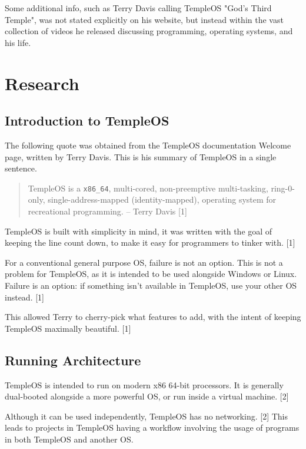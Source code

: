 \documentclass[11pt]{article}
\begin{document}
Some additional info, such as Terry Davis calling TempleOS "God's Third Temple",
was not stated explicitly on his website, but instead within the vast collection
of videos he released discussing programming, operating systems, and his life.

 \newpage
{}

\section{Research}
\label{sec:orgc9641cb}

\subsection{Introduction to TempleOS}
\label{sec:orgb89b368}

The following quote was obtained from the TempleOS documentation Welcome page,
written by Terry Davis. This is his summary of TempleOS in a single sentence.

\begin{quote}
TempleOS is a \texttt{x86\_64}, multi-cored, non-preemptive multi-tasking, ring-0-only,
single-address-mapped (identity-mapped), operating system for recreational
programming. -- Terry Davis [1]
\end{quote}

TempleOS is built with simplicity in mind, it was written with the goal of
keeping the line count down, to make it easy for programmers to tinker with. [1]

For a conventional general purpose OS, failure is not an option. This is not a
problem for TempleOS, as it is intended to be used alongside Windows or Linux.
Failure is an option: if something isn't available in TempleOS, use your other
OS instead. [1]

This allowed Terry to cherry-pick what features to add, with the intent of
keeping TempleOS maximally beautiful. [1]

 \newpage

\subsection{Running Architecture}
\label{sec:org6733a4f}

TempleOS is intended to run on modern x86 64-bit processors. It is generally
dual-booted alongside a more powerful OS, or run inside a virtual machine. [2]

Although it can be used independently, TempleOS has no networking. [2] This
leads to projects in TempleOS having a workflow involving the usage of programs
in both TempleOS and another OS.
\end{document}
